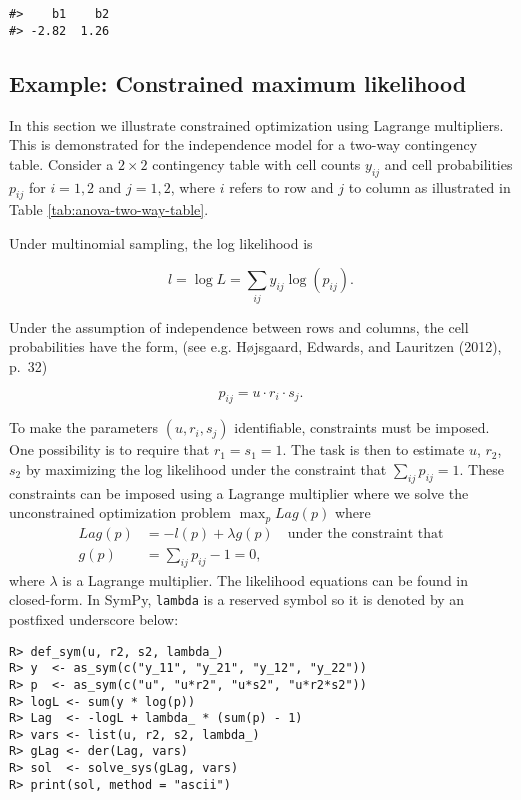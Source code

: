 \begin{verbatim}
#>    b1    b2 
#> -2.82  1.26
\end{verbatim}

\hypertarget{example-constrained-maximum-likelihood}{%
\subsection{Example: Constrained maximum likelihood}\label{example-constrained-maximum-likelihood}}

In this section we illustrate constrained optimization using Lagrange multipliers.
This is demonstrated for the independence model for a two-way contingency table.
Consider a \(2 \times 2\) contingency table with cell
counts \(y_{ij}\) and cell probabilities \(p_{ij}\) for \(i=1,2\) and \(j=1,2\),
where \(i\) refers to row and \(j\) to column as
illustrated in Table \ref{tab:anova-two-way-table}.

Under multinomial sampling, the log likelihood is

\begin{equation}
 l = \log L = \sum_{ij} y_{ij} \log(p_{ij}).
\end{equation}

Under the assumption of independence between rows and columns, the cell
probabilities have the form, (see e.g. Højsgaard, Edwards, and Lauritzen (2012), p.~32)

\begin{equation}
p_{ij}=u \cdot r_i \cdot s_j.
\end{equation}

To make the parameters \((u, r_i, s_j)\) identifiable, constraints
must be imposed. One possibility is to require that \(r_1=s_1=1\). The
task is then to estimate \(u\), \(r_2\), \(s_2\) by maximizing the log likelihood
under the constraint that \(\sum_{ij} p_{ij} = 1\). These constraints
can be
imposed using a Lagrange multiplier where we solve the
unconstrained optimization problem \(\max_p Lag(p)\) where
\begin{align}
  Lag(p) &= -l(p) + \lambda g(p) \quad \text{under the constraint that} \\
  g(p) &= \sum_{ij} p_{ij} - 1 = 0 ,
\end{align}
where \(\lambda\) is a Lagrange multiplier.
The likelihood equations can be found in closed-form.
In SymPy, \texttt{lambda} is a reserved symbol so it is denoted by an postfixed underscore below:

\begin{verbatim}
R> def_sym(u, r2, s2, lambda_)
R> y  <- as_sym(c("y_11", "y_21", "y_12", "y_22"))
R> p  <- as_sym(c("u", "u*r2", "u*s2", "u*r2*s2"))
R> logL <- sum(y * log(p))
R> Lag  <- -logL + lambda_ * (sum(p) - 1) 
R> vars <- list(u, r2, s2, lambda_)
R> gLag <- der(Lag, vars)
R> sol  <- solve_sys(gLag, vars)
R> print(sol, method = "ascii")
\end{verbatim}

